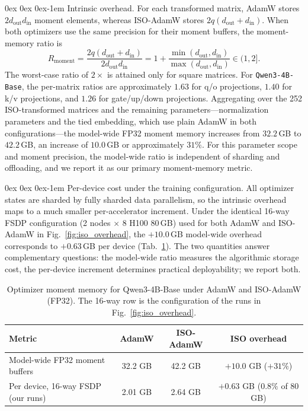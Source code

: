 \documentclass[11pt, a4paper]{utda}
\makeatletter
\renewcommand{\paragraph}{%
  \@startsection{paragraph}{4}%
  {\z@}{0ex \@plus 0ex \@minus 0ex}{-1em}%
  {\normalfont\normalsize\bfseries}%
}
\theoremstyle{plain}
\theoremstyle{definition}
\theoremstyle{remark}
\makeatother
\begin{document}
\paragraph{Intrinsic overhead.}
For each transformed matrix, AdamW stores
$2d_{\mathrm{out}}d_{\mathrm{in}}$ moment elements, whereas
ISO-AdamW stores $2q(d_{\mathrm{out}}+d_{\mathrm{in}})$.
When both optimizers use the same precision for their moment
buffers, the moment-memory ratio is
\begin{equation}
R_{\mathrm{moment}}
=
\frac{2q(d_{\mathrm{out}}+d_{\mathrm{in}})}
     {2d_{\mathrm{out}}d_{\mathrm{in}}}
=
1+
\frac{\min(d_{\mathrm{out}},d_{\mathrm{in}})}
     {\max(d_{\mathrm{out}},d_{\mathrm{in}})}
\in(1,2].
\end{equation}
The worst-case ratio of $2\times$ is attained only for square
matrices. For \texttt{Qwen3-4B-Base}, the per-matrix ratios are
approximately $1.63$ for q/o projections, $1.40$ for k/v
projections, and $1.26$ for gate/up/down projections.
Aggregating over the 252 ISO-transformed matrices and the
remaining parameters---normalization parameters and the tied
embedding, which use plain AdamW in both configurations---the
model-wide FP32 moment memory increases from $32.2$\,GB to
$42.2$\,GB, an increase of $10.0$\,GB or approximately $31\%$.
For this parameter scope and moment precision, the model-wide
ratio is independent of sharding and offloading, and we report
it as our primary moment-memory metric.



\paragraph{Per-device cost under the training configuration.}
All optimizer states are sharded by fully sharded data parallelism, so the intrinsic overhead maps to a much
smaller per-accelerator increment. Under the identical 16-way FSDP configuration (2 nodes $\times$ 8 H100
80\,GB) used for both AdamW and ISO-AdamW in Fig.~\ref{fig:iso_overhead}, the $+10.0$\,GB model-wide
overhead corresponds to $+0.63$\,GB per device (Tab.~\ref{tab:memory_overhead}). The two quantities answer
complementary questions: the model-wide ratio measures the algorithmic storage cost, the per-device increment
determines practical deployability; we report both.

\begin{table}[h]
\centering
\small
\caption{Optimizer moment memory for Qwen3-4B-Base under AdamW and ISO-AdamW (FP32). The 16-way row is the
configuration of the runs in Fig.~\ref{fig:iso_overhead}.}
\label{tab:memory_overhead}
\begin{tabular}{lccc}
\toprule
Metric & AdamW & ISO-AdamW & ISO overhead \\
\midrule
Model-wide FP32 moment buffers            & 32.2 GB & 42.2 GB & $+10.0$ GB ($+31\%$) \\
Per device, 16-way FSDP (our runs)        & 2.01 GB & 2.64 GB & $+0.63$ GB ($0.8\%$ of 80 GB) \\
\bottomrule
\end{tabular}
\end{table}
\end{document}
